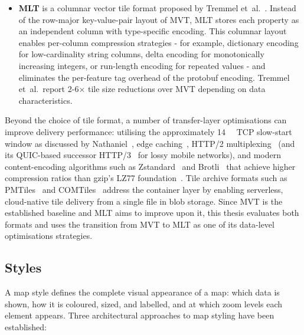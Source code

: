 \begin{itemize}
    \item \begin{sloppypar}\textbf{\acf{MLT}} is a columnar vector tile format proposed by Tremmel et~al.~\cite{tremmelMapLibreTileNext2025}.
    Instead of the row-major key-value-pair layout of \ac{MVT}, \ac{MLT} stores each property as an independent column with type-specific encoding.
    This columnar layout enables per-column compression strategies - for example, dictionary encoding for low-cardinality string columns, delta encoding for monotonically increasing integers, or run-length encoding for repeated values - and eliminates the per-feature tag overhead of the protobuf encoding.
    Tremmel et~al.\ report 2-6$\times$ tile size reductions over \ac{MVT} depending on data characteristics.\end{sloppypar}
\end{itemize}

Beyond the choice of tile format, a number of transfer-layer optimisations can improve delivery performance: utilising the approximately \qty{14}{\kilo\byte} TCP slow-start window as discussed by Nathaniel~\cite{WhyYourWebsite}, edge caching~\cite{BestPracticesMap}, HTTP/2 multiplexing~\cite{belsheHTTP2RFC2015} (and its QUIC-based successor HTTP/3~\cite{bishopHTTP3RFC2022} for lossy mobile networks), and modern content-encoding algorithms such as Zstandard~\cite{colletZstandardRFC2021} and Brotli~\cite{alakuijalaBrotliRFC2016} that achieve higher compression ratios than gzip's LZ77 foundation~\cite{zivUniversalAlgorithmSequential1977}.
Tile archive formats such as PMTiles~\cite{liuPMTiles2022} and COMTiles~\cite{tremmelCOMTilesCloudOptimized2023} address the container layer by enabling serverless, cloud-native tile delivery from a single file in blob storage.
Since \ac{MVT} is the established baseline and \ac{MLT} aims to improve upon it, this thesis evaluates both formats and uses the transition from \ac{MVT} to \ac{MLT} as one of its data-level optimisations strategies.

\subsection{Styles}\label{sec_styles}

A map style defines the complete visual appearance of a map: which data is shown, how it is coloured, sized, and labelled, and at which zoom levels each element appears.
Three architectural approaches to map styling have been established:

